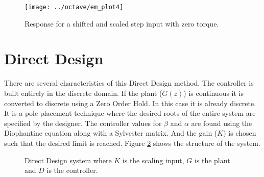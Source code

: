 \documentclass{article}
\begin{document}
\begin{figure}[htbp!]
\begin{center}
\texttt{[image: ../octave/em\_plot4]}
\end{center}
\caption{Response for a shifted and scaled step input with zero torque.}
\label{fig:em_plot4}
\end{figure}


\clearpage

\section{Direct Design}

There are several characteristics of this Direct Design method.
The controller is built entirely in the discrete domain.
If the plant ($G(z)$) is continuous it is converted to discrete
using a Zero Order Hold.
In this case it is already discrete.
It is a pole placement technique where the desired roots of the
entire system are specified by the designer.
The controller values for $\beta$ and $\alpha$ are found using the
Diophantine equation along with a Sylvester matrix.
And the gain ($K$) is chosen such that the desired limit is reached.
Figure \ref{fig:ddc} shows the structure of the system.

\begin{figure}[h!]

\begin{center}
\end{center}

\caption{Direct Design system where $K$ is the scaling input, $G$ is
the plant and $D$ is the controller.}
\label{fig:ddc}
\end{figure}
\end{document}
